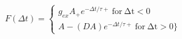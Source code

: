  $F(\Delta t) =  \begin{cases} g_{ex} A_{+} e^{−\Delta t/τ+}\:\mathrm{for\:\Delta t <0}\\A- (DA) e^{−\Delta t/τ+}\:\mathrm{for\:\Delta t > 0}\} \end{cases}$
 